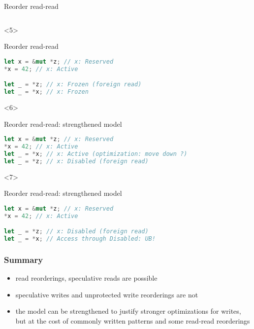 \begin{frame}[fragile, t]
\begin{onlyenv}
\begin{block}{{\cmark} Reorder read-read}
\begin{lstlisting}[language=rust]
            \end{lstlisting}
        \end{block}
    \end{onlyenv}

    \begin{onlyenv}<5>
        \begin{block}{{\cmark} Reorder read-read}
            \begin{lstlisting}[language=rust]
let x = &mut *z; // x: Reserved
*x = 42; // x: Active

let _ = *z; // x: Frozen (foreign read)
let _ = *x; // x: Frozen
            \end{lstlisting}
        \end{block}
    \end{onlyenv}

    \begin{onlyenv}<6>
        \begin{block}{{\xmark} Reorder read-read: strengthened model}
            \begin{lstlisting}[language=rust]
let x = &mut *z; // x: Reserved
*x = 42; // x: Active
let _ = *x; // x: Active (optimization: move down ?)
let _ = *z; // x: Disabled (foreign read)

            \end{lstlisting}
        \end{block}
    \end{onlyenv}

    \begin{onlyenv}<7>
        \begin{block}{{\xmark} Reorder read-read: strengthened model}
            \begin{lstlisting}[language=rust]
let x = &mut *z; // x: Reserved
*x = 42; // x: Active

let _ = *z; // x: Disabled (foreign read)
let _ = *x; // Access through Disabled: UB!
            \end{lstlisting}
        \end{block}
    \end{onlyenv}
\end{frame}

\begin{frame}
    \frametitle{Summary}
    \begin{itemize}
        \item read reorderings, speculative reads are possible
        \item speculative writes and unprotected write reorderings are not
        \item the model can be strengthened to justify stronger optimizations for
            writes, but at the cost of commonly written patterns and some read-read reorderings
    \end{itemize}
\end{frame}
